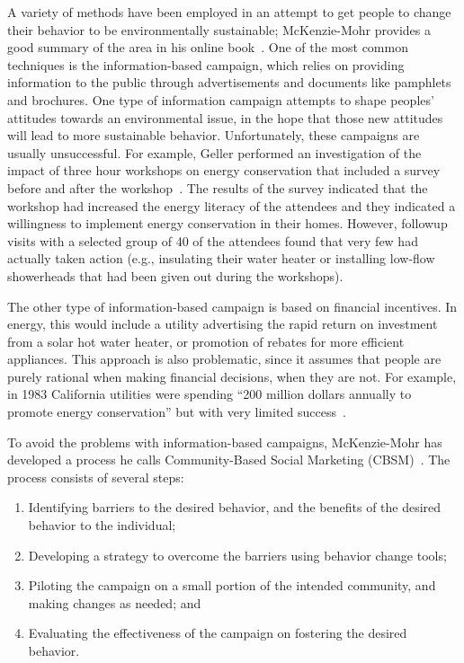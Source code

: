 A variety of methods have been employed in an attempt to get people to change their behavior to be environmentally sustainable; McKenzie-Mohr provides a good summary of the area in his online book~\cite{McKenzie-Mohr2009}. One of the most common techniques is the information-based campaign, which relies on providing information to the public through advertisements and documents like pamphlets and brochures. One type of information campaign attempts to shape peoples' attitudes towards an environmental issue, in the hope that those new attitudes will lead to more sustainable behavior. Unfortunately, these campaigns are usually unsuccessful. For example, Geller performed an investigation of the impact of three hour workshops on energy conservation that included a survey before and after the workshop~\cite{Geller81}. The results of the survey indicated that the workshop had increased the energy literacy of the attendees and they indicated a willingness to implement energy conservation in their homes. However, followup visits with a selected group of 40 of the attendees found that very few had actually taken action (e.g., insulating their water heater or installing low-flow showerheads that had been given out during the workshops).

The other type of information-based campaign is based on financial incentives. In energy, this would include a utility advertising the rapid return on investment from a solar hot water heater, or promotion of rebates for more efficient appliances. This approach is also problematic, since it assumes that people are purely rational when making financial decisions, when they are not. For example, in 1983 California utilities were spending ``200 million dollars annually to promote energy conservation'' but with very limited success~\cite{Costanzo86}.

To avoid the problems with information-based campaigns, McKenzie-Mohr has developed a process he calls Community-Based Social Marketing (CBSM)~\cite{McKenzie-Mohr2009}. The process consists of several steps:

\begin{enumerate}
	\item Identifying barriers to the desired behavior, and the benefits of the desired behavior to the individual;
	\item Developing a strategy to overcome the barriers using behavior change tools;
	\item Piloting the campaign on a small portion of the intended community, and making changes as needed; and
	\item Evaluating the effectiveness of the campaign on fostering the desired behavior.
\end{enumerate}

